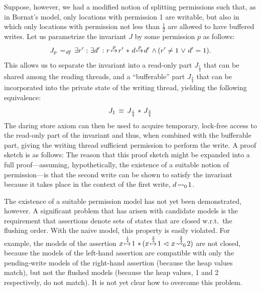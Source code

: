 \documentclass[11pt]{report}         %
\begin{document}
Suppose, however, we had a modified notion of splitting permissions such that, as in Bornat's model, only locations with permission 1 are writable, but also in which only locations with permission not less than $\frac{1}{2}$ are allowed to have buffered writes. Let us parametrize the invariant $J$ by some permission $p$ as follows: \[ J_p \operatorname{\;=_{\mathit{df}}\;} \exists r' \operatorname{\,:\,} \exists d' \operatorname{\,:\,} r \stackrel{p}{\!\mapsto\!} r' \operatorname{\,\ast\,} d \stackrel{p}{\!\mapsto\!} d' \operatorname{\,\wedge\,} (r' \neq 1 \operatorname{\,\vee\,} d' = 1). \] This allows us to separate the invariant into a read-only part $J_{\frac{1}{4}}$ that can be shared among the reading threads, and a ``bufferable'' part $J_{\frac{3}{4}}$ that can be incorporated into the private state of the writing thread, yielding the following equivalence: \[ J_1 \,\equiv\, J_{\frac{1}{4}} \operatorname{\,\ast\,} J_{\frac{3}{4}}\] The daring store axiom can then be used to acquire temporary, lock-free access to the read-only part of the invariant and thus, when combined with the bufferable part, giving the writing thread sufficient permission to perform the write. A proof sketch is as follows: 
 The reason that this proof sketch might be expanded into a full proof---assuming, hypothetically, the existence of a suitable notion of permission---is that the second write can be shown to satisfy the invariant because it takes place in the context of the first write, $d \!\leadsto_{0}\! 1$. 

The existence of a suitable permission model has not yet been demonstrated, however. A significant problem that has arisen with candidate models is the requirement that assertions denote sets of states that are closed w.r.t.\ the flushing order. With the naive model, this property is easily violated. For example, the models of the assertion $x \stackrel{\frac{1}{4}}{\!\mapsto\!} 1 \operatorname{\,\ast\,} (x \stackrel{\frac{3}{4}}{\!\mapsto\!} 1 \operatorname{\,\vartriangleleft\,} x \stackrel{\frac{3}{4}}{\!\leadsto_{0}\!} 2)$ are not closed, because the models of the left-hand assertion are compatible with only the pending-write models of the right-hand assertion (because the heap values match), but not the flushed models (because the heap values, 1 and 2 respectively, do not match). It is not yet clear how to overcome this problem.  
\end{document}
